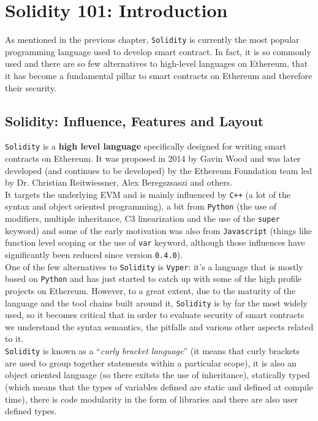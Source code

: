 \chapter{Solidity 101: Introduction}

As mentioned in the previous chapter, \texttt{Solidity} is currently the most popular programming language used to develop smart contract.
In fact, it is so commonly used and there are so few alternatives to high-level languages on Ethereum, that it has become a fundamental pillar to smart contracts on Ethereum and therefore their security.

\section{Solidity: Influence, Features and Layout}

\texttt{Solidity} is a \textbf{high level language} specifically designed for writing smart contracts on Ethereum.
It was proposed in 2014 by Gavin Wood and was later developed (and continues to be developed) by the Ethereum Foundation team led by Dr. Christian Reitwiessner, Alex Beregszsaszi and others.\\

It targets the underlying EVM and is mainly influenced by \texttt{C++} (a lot of the syntax and object oriented programming), a bit from \texttt{Python} (the use of modifiers, multiple inheritance, C3 linearization and the use of the \texttt{super} keyword) and some of the early motivation was also from \texttt{Javascript} (things like function level scoping or the use of \texttt{var} keyword, although those influences have significantly been reduced since version \texttt{0.4.0}).\\

One of the few alternatives to \texttt{Solidity} is \texttt{Vyper}: it's a language that is mostly based on \texttt{Python} and has just started to catch up with some of the high profile projects on Ethereum.
However, to a great extent, due to the maturity of the language and the tool chains built around it, \texttt{Solidity} is by far the most widely used, so it becomes critical that in order to evaluate security of smart contracts we understand the syntax semantics, the pitfalls and various other aspects related to it.\\

\texttt{Solidity} is known as a ``\textit{curly bracket language}'' (it means that curly brackets are used to group together statements within a particular scope), it is also an object oriented language (so there exitsts the use of inheritance), statically typed (which means that the types of variables defined are static and defined at compile time), there is code modularity in the form of libraries and there are also user defined types.\\

